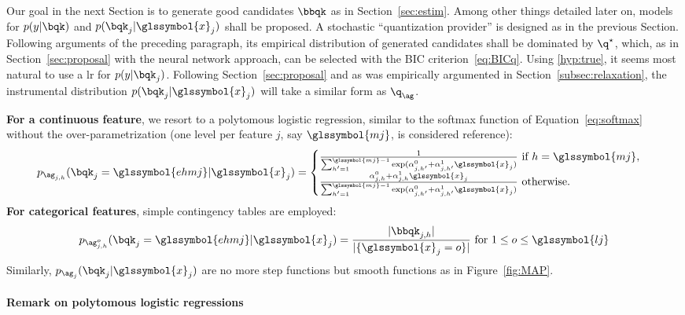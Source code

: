 Our goal in the next Section is to generate good candidates $\bbqk$ as in Section~\ref{sec:estim}. Among other things detailed later on, models for $p(y | \bqk)$ and $p(\bqk_j | \glssymbol{x}_j)$ shall be proposed. 
A stochastic ``quantization provider'' is designed as in the previous Section. Following arguments of the preceding paragraph, its empirical distribution of generated candidates shall be dominated by $\q^\star$,
which, as in Section~\ref{sec:proposal} with the neural network approach, can be selected with the BIC criterion~\eqref{eq:BICq}. Using \eqref{hyp:true}, it seems most natural to use a \gls{lr} for $p( y | \bqk_j)$. Following Section~\ref{sec:proposal} and as was empirically argumented in Section~\ref{subsec:relaxation}, the instrumental distribution $p(\bqk_j | \glssymbol{x}_j)$ will take a similar form as $\q_{\ag}$. 

{\bf For a continuous feature}, we resort to a polytomous logistic regression, similar to the softmax function of Equation~\eqref{eq:softmax} without the over-parametrization (one level per feature $j$, say $\glssymbol{mj}$, is considered reference):
\[ p_{\ag_{j,h}}(\bqk_j = \glssymbol{ehmj} | \glssymbol{x}_j) = \begin{cases} \frac{1}{\sum_{h'=1}^{\glssymbol{mj}-1} \exp(\alpha_{j,h'}^0 + \alpha_{j,h'}^1 \glssymbol{x}_j)} \text{ if } h = \glssymbol{mj}, \\ \frac{\alpha_{j,h}^0 + \alpha_{j,h}^1 \glssymbol{x}_j}{\sum_{h'=1}^{\glssymbol{mj}-1} \exp(\alpha_{j,h'}^0 + \alpha_{j,h'}^1 \glssymbol{x}_j)} \text{ otherwise.} \end{cases} \]
{\bf For categorical features}, simple contingency tables are employed:
\[ p_{\ag_{j,h}^o}(\bqk_j = \glssymbol{ehmj} | \glssymbol{x}_j) = \frac{|\bbqk_{j,h}|}{|\{\glssymbol{x}_j=o\}|} \text{ for } 1 \leq o \leq \glssymbol{lj} \]
Similarly, $p_{\ag_j}(\bqk_j | \glssymbol{x}_j)$ are no more step functions but smooth functions as in Figure~\ref{fig:MAP}.

\paragraph{Remark on polytomous logistic regressions}


